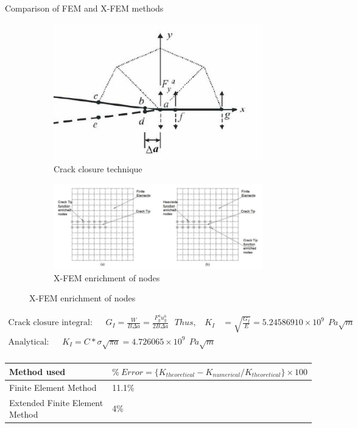 \documentclass{beamer}
\begin{document}
\begin{frame}[t,fragile]{Comparison of FEM and X-FEM methods}
    \vspace{-.7cm}
    \hspace{15pt}
        \begin{figure}[H]
    \begin{subfigure}{0.45\textwidth}
    \centering
    \includegraphics[scale=.2]{crackclosure.png}
    \caption{\tiny Crack closure technique}
\end{subfigure}
        \hspace{15pt}
       \begin{subfigure}{0.45\textwidth}
    \centering
      \includegraphics[scale=.15]{k.png}
    \caption{\tiny X-FEM enrichment of nodes}
\end{subfigure}
\end{figure}
\vspace{-12pt}
    \tiny    
\begin{align*}
       \text{Crack closure integral:}\ \ \ \ \ \ \ G_I=\frac{W}{B\Delta a}=\frac{F_{y}^au_{y}^b}{2B \Delta a}\ \ \ Thus, \ \ \ \
    K_I&=\sqrt{\frac{G_I}{E}}=5.24586910\times 10^9\ \ Pa\sqrt{m}\\ 
   \text{Analytical:}\ \ \ \ \ \ \ K_I=C*\sigma\sqrt{\pi a}=4.726065 \times 10^9\ \ Pa\sqrt{m}\\
\end{align*}
\vspace{-28pt}
\bgroup
\def\arraystretch{2}   
\begin{table}[H]
    \centering
    \begin{tabular}{|C{3cm}|C{6cm}|}
\hline 
Method used& $\% \ Error= \{K_{theoretical}-K_{numerical}/K_{theoretical}\}\times 100$\\
\hline
 Finite Element Method & 11.1\%\\
\hline
 Extended Finite Element Method& 4\%\\
\hline
\end{tabular}
\label{table1}
\end{table}
\egroup
\end{frame} 
\end{document}
